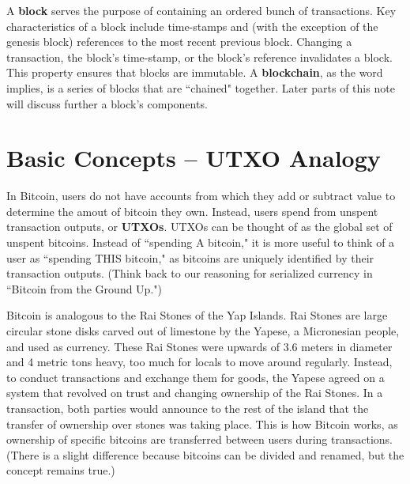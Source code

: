 \documentclass[full.tex]{subfiles}
\begin{document}
    A \textbf{block} serves the purpose of containing an ordered bunch of transactions. Key characteristics of a block include time-stamps and (with the exception of the genesis block) references to the most recent previous block. Changing a transaction, the block's time-stamp, or the block's reference invalidates a block. This property ensures that blocks are immutable. A \textbf{blockchain}, as the word implies, is a series of blocks that are ``chained" together. Later parts of this note will discuss further a block's components.
       
   \section*{Basic Concepts -- UTXO Analogy}
   
    In Bitcoin, users do not have accounts from which they add or subtract value to determine the amout of bitcoin they own. Instead, users spend from unspent transaction outputs, or \textbf{UTXOs}. UTXOs can be thought of as the global set of unspent bitcoins. Instead of ``spending A bitcoin," it is more useful to think of a user as ``spending THIS bitcoin," as bitcoins are uniquely identified by their transaction outputs. (Think back to our reasoning for serialized currency in ``Bitcoin from the Ground Up.")
    
    Bitcoin is analogous to the Rai Stones of the Yap Islands. Rai Stones are large circular stone disks carved out of limestone by the Yapese, a Micronesian people, and used as currency. These Rai Stones were upwards of 3.6 meters in diameter and 4 metric tons heavy, too much for locals to move around regularly. Instead, to conduct transactions and exchange them for goods, the Yapese agreed on a system that revolved on trust and changing ownership of the Rai Stones. In a transaction, both parties would announce to the rest of the island that the transfer of ownership over stones was taking place. This is how Bitcoin works, as ownership of specific bitcoins are transferred between users during transactions. (There is a slight difference because bitcoins can be divided and renamed, but the concept remains true.)
    
\end{document}
